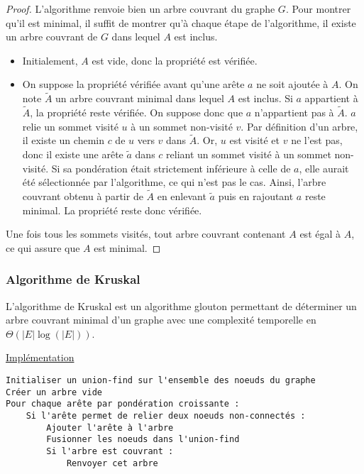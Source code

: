 \documentclass[11pt,a4paper]{article}
\begin{document}
\begin{proof}
  L'algorithme renvoie bien un arbre couvrant du graphe \(G\). Pour montrer qu'il est minimal, il suffit de montrer qu'à chaque étape de l'algorithme, il existe un arbre couvrant de \(G\) dans lequel \(A\) est inclus.
  \begin{itemize}
    \item Initialement, \(A\) est vide, donc la propriété est vérifiée.
    \item On suppose la propriété vérifiée avant qu'une arête \(a\) ne soit ajoutée à \(A\). On note \(\widetilde{A}\) un arbre couvrant minimal dans lequel \(A\) est inclus. Si \(a\) appartient à \(\widetilde{A}\), la propriété reste vérifiée. On suppose donc que \(a\) n'appartient pas à \(\widetilde{A}\). \(a\) relie un sommet visité \(u\) à un sommet non-visité \(v\). Par définition d'un arbre, il existe un chemin \(c\) de \(u\) vers \(v\) dans \(\widetilde{A}\). Or, \(u\) est visité et \(v\) ne l'est pas, donc il existe une arête \(\widetilde{a}\) dans \(c\) reliant un sommet visité à un sommet non-visité. Si sa pondération était strictement inférieure à celle de \(a\), elle aurait été sélectionnée par l'algorithme, ce qui n'est pas le cas. Ainsi, l'arbre couvrant obtenu à partir de \(\widetilde{A}\) en enlevant \(\widetilde{a}\) puis en rajoutant \(a\) reste minimal. La propriété reste donc vérifiée.
  \end{itemize}
  Une fois tous les sommets visités, tout arbre couvrant contenant \(A\) est égal à \(A\), ce qui assure que \(A\) est minimal.
\end{proof}


    \subsubsection{Algorithme de Kruskal}
L'algorithme de Kruskal est un algorithme glouton permettant de déterminer un arbre couvrant minimal d'un graphe avec une complexité temporelle en \(\Theta\left(|E|\log(|E|)\right)\).

\noindent\href{https://github.com/AdrienVannson/algo-lib/blob/master/include/graphs/algorithms/kruskal.hpp}{Implémentation}
\begin{lstlisting}
Initialiser un union-find sur l'ensemble des noeuds du graphe
Créer un arbre vide
Pour chaque arête par pondération croissante :
    Si l'arête permet de relier deux noeuds non-connectés :
        Ajouter l'arête à l'arbre
        Fusionner les noeuds dans l'union-find
        Si l'arbre est couvrant :
            Renvoyer cet arbre
\end{lstlisting}
\end{document}
